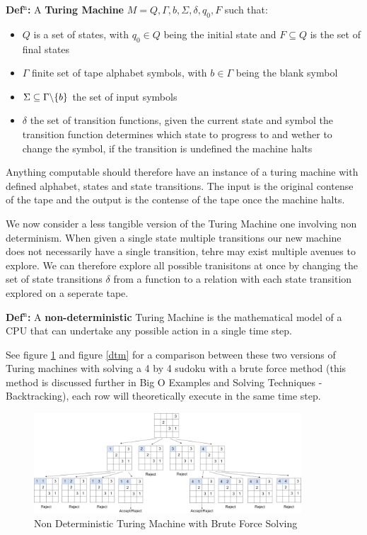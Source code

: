 \documentclass[a4paper,11pt]{report}
\newcounter{row}
\begin{document}
\textbf{Def$^\text{n}$:} A \textbf{Turing Machine} $M={Q,\Gamma,b,\Sigma, \delta, q_0, F}$ such that:
\begin{itemize}
\item $Q$ is a set of states, with $q_0\in Q$ being the initial state and $F\subseteq Q$ is the set of final states
\item $\Gamma$ finite set of tape alphabet symbols, with $b\in \Gamma$ being the blank symbol
\item $\Sigma\subseteq \Gamma \symbol{92} \{b\}$ the set of input symbols
\item $\delta$ the set of transition functions, given the current state and symbol the transition function determines which state to progress to and wether to change the symbol, if the transition is undefined the machine halts
\end{itemize}

Anything computable should therefore have an instance of a turing machine with defined alphabet, states and state transitions. The input is the original contense of the tape and the output is the contense of the tape once the machine halts. 

We now consider a less tangible version of the Turing Machine one involving non determinism. When given a single state multiple transitions our new machine does not necessarily have a single transition, tehre may exist multiple avenues to explore. We can therefore explore all possible tranisitons at once by changing the set of state transitions $\delta$ from a function to a relation with each state transition explored on a seperate tape. 

\textbf{Def$^\text{n}$:} A \textbf{non-deterministic} Turing Machine is the mathematical model of a CPU that can undertake any possible action in a single time step.

See figure \ref{ndtm} and figure \ref{dtm} for a comparison between these two versions of Turing machines with solving a 4 by 4 sudoku with a brute force method (this method is discussed further in Big O Examples and Solving Techniques - Backtracking), each row will theoretically execute in the same time step.

\begin{figure}[h!]
	\begin{center}
		\includegraphics[width=100mm]{figures/turing_non_determinism.png}
	\end{center}
	\caption{\label{ndtm} Non Deterministic Turing Machine with Brute Force Solving}
\end{figure}
\end{document}

